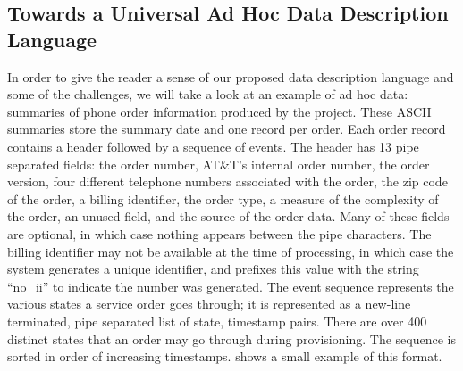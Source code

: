 \documentclass[11pt]{article}
\begin{document}



\subsection{Towards a Universal Ad Hoc Data Description Language}
\label{sec:universal}

In order to give the reader a sense of our proposed data
description language and some of the challenges, we
will take a look at an example of ad hoc data: summaries of
phone order information produced by the \dibbler{} project.
These ASCII summaries store the summary date and one record per order.
Each order record contains a header followed by a sequence of events.
The header has 13 pipe separated fields: the order number, AT\&T's
internal order number, the order version, four different telephone
numbers associated with the order, the zip code of the order, a
billing identifier, the order type, a measure of the complexity of the
order, an unused field, and the source of the order data.  Many of
these fields are optional, in which case nothing appears between the
pipe characters.  The billing identifier may not be available at the
time of processing, in which case the system generates a unique
identifier, and prefixes this value with the string ``no\_ii'' to
indicate the number was generated. The event sequence represents the
various states a service order goes through; it is represented as a
new-line terminated, pipe separated list of state, timestamp pairs.
There are over 400 distinct states that an order may go through during
provisioning.  The sequence is sorted in order of increasing timestamps. 
 shows a small example of
this format.
\end{document}
